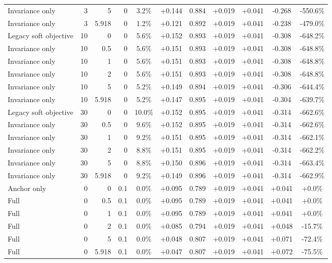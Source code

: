 \begin{table}[htbp]
\begin{tabular}{lrrrccccccc}
Invariance only & 3 & 5 & 0 & 3.2\% & +0.144 & 0.884 & +0.019 & +0.041 & -0.268 & -550.6\% \\
Invariance only & 3 & 5.918 & 0 & 1.2\% & +0.121 & 0.892 & +0.019 & +0.041 & -0.238 & -479.0\% \\
Legacy soft objective & 10 & 0 & 0 & 5.6\% & +0.152 & 0.893 & +0.019 & +0.041 & -0.308 & -648.2\% \\
Invariance only & 10 & 0.5 & 0 & 5.6\% & +0.151 & 0.893 & +0.019 & +0.041 & -0.308 & -648.8\% \\
Invariance only & 10 & 1 & 0 & 5.6\% & +0.151 & 0.893 & +0.019 & +0.041 & -0.308 & -648.8\% \\
Invariance only & 10 & 2 & 0 & 5.6\% & +0.151 & 0.893 & +0.019 & +0.041 & -0.308 & -648.8\% \\
Invariance only & 10 & 5 & 0 & 5.2\% & +0.149 & 0.894 & +0.019 & +0.041 & -0.306 & -644.4\% \\
Invariance only & 10 & 5.918 & 0 & 5.2\% & +0.147 & 0.895 & +0.019 & +0.041 & -0.304 & -639.7\% \\
Legacy soft objective & 30 & 0 & 0 & 10.0\% & +0.152 & 0.895 & +0.019 & +0.041 & -0.314 & -662.6\% \\
Invariance only & 30 & 0.5 & 0 & 9.6\% & +0.152 & 0.895 & +0.019 & +0.041 & -0.314 & -662.6\% \\
Invariance only & 30 & 1 & 0 & 9.2\% & +0.151 & 0.895 & +0.019 & +0.041 & -0.314 & -662.1\% \\
Invariance only & 30 & 2 & 0 & 8.8\% & +0.151 & 0.895 & +0.019 & +0.041 & -0.314 & -662.2\% \\
Invariance only & 30 & 5 & 0 & 8.8\% & +0.150 & 0.896 & +0.019 & +0.041 & -0.314 & -663.4\% \\
Invariance only & 30 & 5.918 & 0 & 9.2\% & +0.149 & 0.896 & +0.019 & +0.041 & -0.314 & -662.9\% \\
Anchor only & 0 & 0 & 0.1 & 0.0\% & +0.095 & 0.789 & +0.019 & +0.041 & +0.041 & +0.0\% \\
Full & 0 & 0.5 & 0.1 & 0.0\% & +0.095 & 0.789 & +0.019 & +0.041 & +0.041 & +0.0\% \\
Full & 0 & 1 & 0.1 & 0.0\% & +0.095 & 0.789 & +0.019 & +0.041 & +0.041 & +0.0\% \\
Full & 0 & 2 & 0.1 & 0.0\% & +0.085 & 0.794 & +0.019 & +0.041 & +0.048 & -15.7\% \\
Full & 0 & 5 & 0.1 & 0.0\% & +0.048 & 0.807 & +0.019 & +0.041 & +0.071 & -72.4\% \\
Full & 0 & 5.918 & 0.1 & 0.0\% & +0.047 & 0.807 & +0.019 & +0.041 & +0.072 & -75.5\% \\

\end{tabular}
\end{table}
